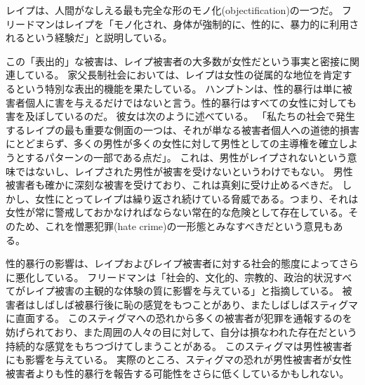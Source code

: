 \documentclass[paper=a4,book,openany]{jlreq}
\newcommand{\ig}[1]{}           %
\begin{document}
レイプは、人間がなしえる最も完全な形のモノ化(objectification)の一つだ。
フリードマン\ig{Karyn L. Freedman}はレイプを「モノ化され、身体が強制的に、性的に、暴力的に利用されるという経験だ」と説明している。

この「表出的」な被害は、レイプ被害者の大多数が女性だという事実と密接に関連している。
家父長制社会においては、レイプは女性の従属的な地位を肯定するという特別な表出的機能を果たしている。
ハンプトンは、性的暴行は単に被害者個人に害を与えるだけではないと言う。性的暴行はすべての女性に対しても害を及ぼしているのだ。
彼女は次のように述べている。
「私たちの社会で発生するレイプの最も重要な側面の一つは、それが単なる被害者個人への道徳的損害にとどまらず、多くの男性が多くの女性に対して男性としての主導権を確立しようとするパターンの一部である点だ」\citep[p.135]{hampton99:_defin_wrong_and_defin_rape}。
これは、男性がレイプされないという意味ではないし、レイプされた男性が被害を受けないというわけでもない。
男性被害者も確かに深刻な被害を受けており、これは真剣に受け止めるべきだ。
しかし、女性にとってレイプは繰り返され続けている脅威である。つまり、それは女性が常に警戒しておかなければならない常在的な危険として存在している。そのため、これを憎悪犯罪(hate crime)の一形態とみなすべきだという意見もある\citep{campo-engelstein16:_rape_hate_crime}。

性的暴行の影響は、レイプおよびレイプ被害者に対する社会的態度によってさらに悪化している。
フリードマンは「社会的、文化的、宗教的、政治的状況すべてがレイプ被害の主観的な体験の質に影響を与えている」と指摘している。
被害者はしばしば被暴行後に恥の感覚をもつことがあり、またしばしばスティグマに直面する。
このスティグマへの恐れから多くの被害者が犯罪を通報するのを妨げられており、また周囲の人々の目に対して、自分は損なわれた存在だという持続的な感覚をもちつづけてしまうことがある。
このスティグマは男性被害者にも影響を与えている。
実際のところ、スティグマの恐れが男性被害者が女性被害者よりも性的暴行を報告する可能性をさらに低くしているかもしれない\citep{mezey87:_male_victim_sexual_assaul}。
\end{document}
